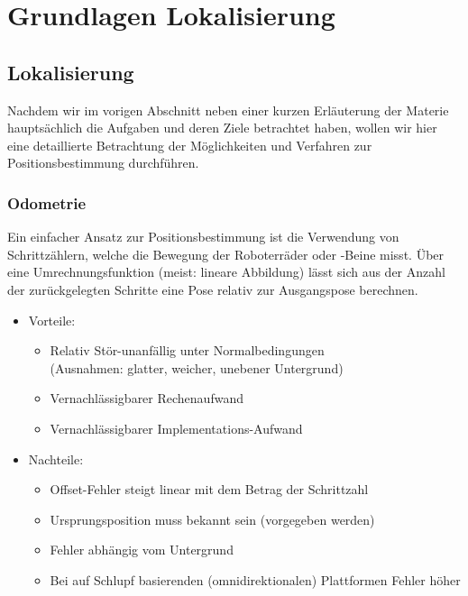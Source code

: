 \section{Grundlagen Lokalisierung}
\label{lokalisierung_grundlagen_sec}
\authorsection{\editordummy}
\subsection{Lokalisierung}
Nachdem wir im vorigen Abschnitt neben einer kurzen Erläuterung der
Materie hauptsächlich die Aufgaben und deren Ziele betrachtet haben,
 wollen wir hier eine detaillierte Betrachtung der Möglichkeiten
 und Verfahren zur Positionsbestimmung durchführen.
 
\subsubsection{Odometrie}
Ein einfacher Ansatz zur Positionsbestimmung ist die Verwendung
 von Schrittzählern, welche die Bewegung der Roboterräder oder
 -Beine misst. Über eine Umrechnungsfunktion (meist: lineare
 Abbildung) lässt sich aus der Anzahl der zurückgelegten Schritte
 eine Pose relativ zur Ausgangspose berechnen.

\begin{itemize}
  \item Vorteile:
  \begin{itemize}
    \item Relativ Stör-unanfällig unter Normalbedingungen\\ 
    (Ausnahmen: glatter, weicher, unebener Untergrund)
    \item Vernachlässigbarer Rechenaufwand
    \item Vernachlässigbarer Implementations-Aufwand
  \end{itemize}
  \item Nachteile:
  \begin{itemize}
    \item Offset-Fehler steigt linear mit dem Betrag der Schrittzahl
    \item Ursprungsposition muss bekannt sein (vorgegeben werden)
    \item Fehler abhängig vom Untergrund
    \item Bei auf Schlupf basierenden (omnidirektionalen)
     Plattformen Fehler höher
   \end{itemize}
\end{itemize}

